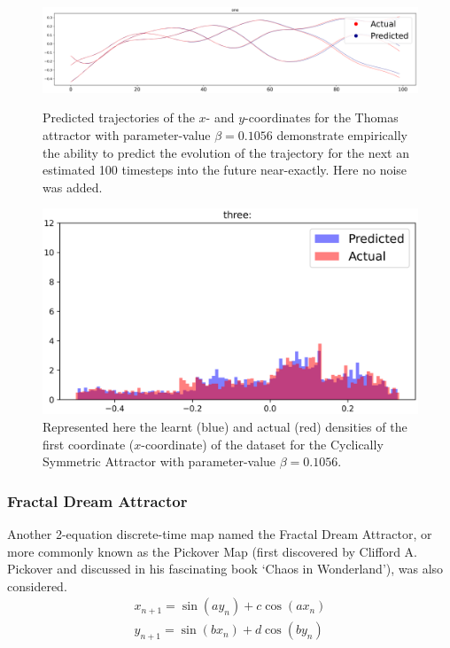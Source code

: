 \begin{figure}[ht]
  \centering
  \includegraphics[scale=0.35]{Graphs/_Thomas_1.eps}\caption*{Predicted trajectories of the $x$- and $y$-coordinates for the Thomas attractor with parameter-value $\beta=0.1056$ demonstrate empirically the ability to predict the evolution of the trajectory for the next an estimated 100 timesteps into the future near-exactly. Here no noise was added.}
  \includegraphics[scale=0.5]{Graphs/_Thomas_3.eps}\caption*{Represented here the learnt (blue) and actual (red) densities of the first coordinate ($x$-coordinate) of the dataset for the Cyclically Symmetric Attractor with parameter-value $\beta=0.1056$.}
\end{figure}


\subsubsection{Fractal Dream Attractor}

Another 2-equation discrete-time map named the Fractal Dream Attractor, or more commonly known as the Pickover Map (first discovered by Clifford A. Pickover and discussed in his fascinating book `Chaos in Wonderland'\cite{PickoverChaos}), was also considered.
\begin{eqnarray}\label{eqns_clifford}
  {x_{n+1}=\sin(ay_n) + c\cos(ax_n)} \\
  {y_{n+1}=\sin(bx_n)+d\cos(by_n)}
\end{eqnarray}

